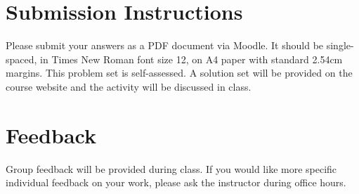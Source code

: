 \documentclass[a4paper]{exam}
\begin{document}
\section{Submission Instructions}\label{submission-instructions}

Please submit your answers as a PDF document via Moodle. It should be single-spaced, in Times New Roman font size 12, on A4 paper with standard 2.54cm margins. This problem set is self-assessed. A solution set will be provided on the course website and the activity will be discussed in class.

\section{Feedback}\label{feedback}

Group feedback will be provided during class. If you would like more specific individual feedback on your work, please ask the instructor during office hours.
\end{document}
